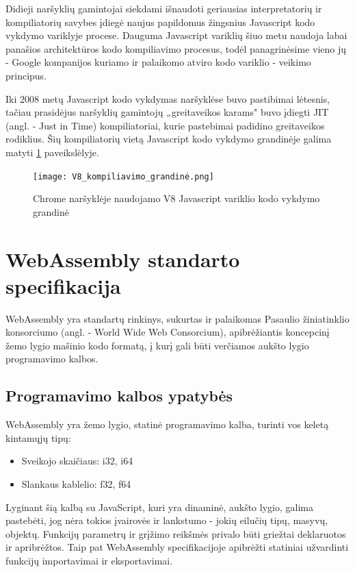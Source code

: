 \documentclass{VUMIFPSkursinis}
\begin{document}
Didieji naršyklių gamintojai siekdami išnaudoti geriausias interpretatorių ir kompiliatorių savybes įdiegė naujus papildomus žingsnius Javascript kodo vykdymo variklyje procese. Dauguma Javascript variklių šiuo metu naudoja labai panašios architektūros kodo kompiliavimo procesus, todėl panagrinėsime vieno jų - Google kompanijos kuriamo ir palaikomo atviro kodo variklio - veikimo principus.

Iki 2008 metų Javascript kodo vykdymas naršyklėse buvo pastibimai lėtesnis, tačiau prasidėjus naršyklių gamintojų „greitaveikos karams" buvo įdiegti JIT (angl. - Just in Time) kompiliatoriai, kurie pastebimai padidino greitaveikos rodiklius. Šių kompiliatorių vietą Javascript kodo vykdymo grandinėje galima matyti \ref{fig:v8_pipeline} paveikslėlyje.

\begin{figure}[h!]
  \begin{center}
  \texttt{[image: V8\_kompiliavimo\_grandinė.png]}
  \end{center}
  \caption{Chrome naršyklėje naudojamo V8 Javascript variklio kodo vykdymo grandinė}
  \label{fig:v8_pipeline}
\end{figure}

\section{WebAssembly standarto specifikacija}

WebAssembly yra standartų rinkinys, sukurtas ir palaikomas Pasaulio žiniatinklio konsorciumo (angl. - World Wide Web Consorcium), apibrėžiantis koncepcinį žemo lygio mašinio kodo formatą, į kurį gali būti verčiamos aukšto lygio programavimo kalbos.

\subsection{Programavimo kalbos ypatybės}
WebAssembly yra žemo lygio, statinė programavimo kalba, turinti vos keletą kintamųjų tipų:

\begin{itemize}
    \item Sveikojo skaičiaus: i32, i64
    \item Slankaus kablelio: f32, f64
\end{itemize}

Lyginant šią kalbą su JavaScript, kuri yra dinaminė, aukšto lygio, galima pastebėti, jog nėra tokios įvairovės ir lankstumo - jokių eilučių tipų, masyvų, objektų. Funkcijų parametrų ir grįžimo reikšmės privalo būti griežtai deklaruotos ir apribrėžtos. Taip pat WebAssembly specifikacijoje apibrėžti statiniai užvardinti funkcijų importavimai ir eksportavimai.
\end{document}
